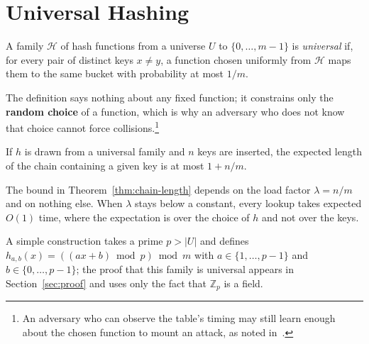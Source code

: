 \section{Universal Hashing}\label{sec:universal}

A family $\mathcal{H}$ of hash functions from a universe $U$ to $\{0, \dots, m-1\}$
is \emph{universal} if, for every pair of distinct keys $x \neq y$, a function
chosen uniformly from $\mathcal{H}$ maps them to the same bucket with probability
at most $1/m$.

The definition says nothing about any fixed function; it constrains only the
\textbf{random choice} of a function, which is why an adversary who does not know
that choice cannot force collisions.\footnote{An adversary who can observe the
table's timing may still learn enough about the chosen function to mount an
attack, as noted in~\cite{crosby2003}.}

\begin{theorem}\label{thm:chain-length}
If $h$ is drawn from a universal family and $n$ keys are inserted, the expected
length of the chain containing a given key is at most $1 + n/m$.
\end{theorem}

The bound in Theorem~\ref{thm:chain-length} depends on the load factor
$\lambda = n/m$ and on nothing else. When $\lambda$ stays below a constant, every
lookup takes expected $O(1)$ time, where the expectation is over the choice of $h$
and not over the keys.

A simple construction takes a prime $p > |U|$ and defines
$h_{a,b}(x) = ((ax + b) \bmod p) \bmod m$ with $a \in \{1, \dots, p-1\}$ and
$b \in \{0, \dots, p-1\}$; the proof that this family is universal appears in
Section~\ref{sec:proof} and uses only the fact that $\mathbb{Z}_p$ is a field.
